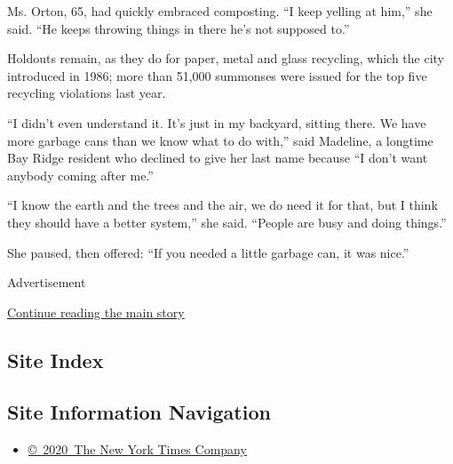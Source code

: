 Ms. Orton, 65, had quickly embraced composting. ``I keep yelling at
him,'' she said. ``He keeps throwing things in there he's not supposed
to.''

Holdouts remain, as they do for paper, metal and glass recycling, which
the city introduced in 1986; more than 51,000 summonses were issued for
the top five recycling violations last year.

``I didn't even understand it. It's just in my backyard, sitting there.
We have more garbage cans than we know what to do with,'' said Madeline,
a longtime Bay Ridge resident who declined to give her last name because
``I don't want anybody coming after me.''

``I know the earth and the trees and the air, we do need it for that,
but I think they should have a better system,'' she said. ``People are
busy and doing things.''

She paused, then offered: ``If you needed a little garbage can, it was
nice.''

Advertisement

\protect\hyperlink{after-bottom}{Continue reading the main story}

\hypertarget{site-index}{%
\subsection{Site Index}\label{site-index}}

\hypertarget{site-information-navigation}{%
\subsection{Site Information
Navigation}\label{site-information-navigation}}

\begin{itemize}
\tightlist
\item
  \href{https://help.nytimes3xbfgragh.onion/hc/en-us/articles/115014792127-Copyright-notice}{©~2020~The
  New York Times Company}
\end{itemize}

